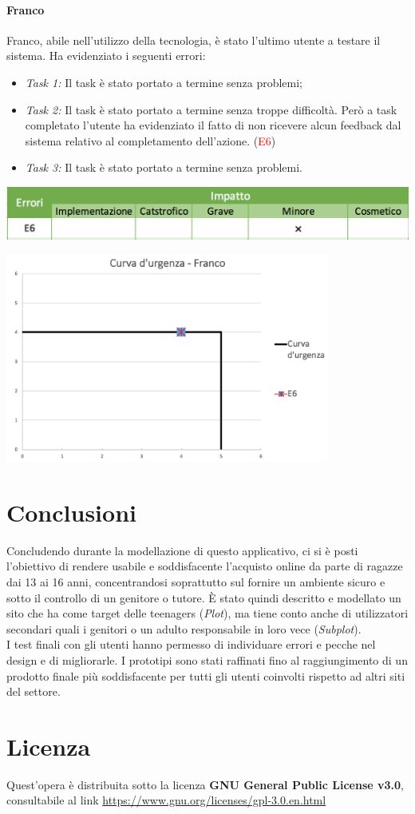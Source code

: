 \documentclass[12pt,a4paper]{report}
\begin{document}
  \subsubsection{Franco}
  Franco, abile nell'utilizzo della tecnologia, è stato l'ultimo utente a testare il sistema. Ha evidenziato i seguenti errori:
  \begin{itemize}
    \item \textit{Task 1:} Il task è stato portato a termine senza problemi;
    \item \textit{Task 2:} Il task è stato portato a termine senza troppe difficoltà. Però a task completato l'utente ha evidenziato il fatto di non ricevere alcun feedback dal sistema relativo al completamento dell'azione. (\textcolor{red}{E6})
    \item \textit{Task 3:} Il task è stato portato a termine senza problemi.
  \end{itemize}
  \includegraphics[width=1\textwidth]{"Project Management Sources/ImpattoFranco"}
  \begin{center}
    \includegraphics[width=0.8\textwidth]{"Project Management Sources/UrgenzaFranco"}
  \end{center}
\chapter{Conclusioni}
Concludendo durante la modellazione di questo applicativo, ci si è posti l'obiettivo di rendere usabile e soddisfacente l'acquisto online da parte di ragazze dai 13 ai 16 anni, concentrandosi soprattutto sul fornire un ambiente sicuro e sotto il controllo di un genitore o tutore. È stato quindi descritto e modellato un sito che ha come target delle teenagers (\textit{Plot}), ma tiene conto anche di utilizzatori secondari quali i genitori o un adulto responsabile in loro vece (\textit{Subplot}).\\
I test finali con gli utenti hanno permesso di individuare errori e pecche nel design e di migliorarle. I prototipi sono stati raffinati fino al raggiungimento di un prodotto finale più soddisfacente per tutti gli utenti coinvolti rispetto ad altri siti del settore.
\chapter{Licenza}
Quest'opera è distribuita sotto la licenza \textbf{GNU General Public License v3.0}, consultabile al link  \textcolor{blue}{\href{https://www.gnu.org/licenses/gpl-3.0.en.html}{https://www.gnu.org/licenses/gpl-3.0.en.html}}
\end{document}
